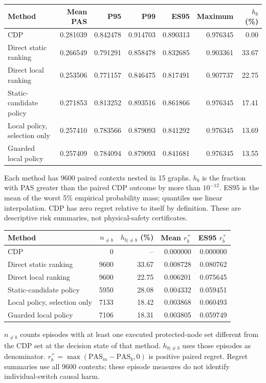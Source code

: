 \documentclass[10pt]{article}
\makeatletter
\newcommand{\tablefoot}[1]{\par\vspace{3pt}\begin{minipage}{\linewidth}\footnotesize #1\end{minipage}}
\newenvironment{exporttable}{\par\noindent\begin{minipage}{\linewidth}\def\@captype{table}}{\end{minipage}\par}
\makeatother
\begin{document}
\begin{exporttable}\centering
\small
\caption{Empirical service-loss and baseline-relative risk in the matched multi-topology study.}\label{tab:reliability_summary}
\begin{tabularx}{\linewidth}{Xrrrrrr}\toprule
Method & Mean PAS & P95 & P99 & ES95 & Maximum & $h_b$ (\%)\\\midrule
CDP & 0.281039 & 0.842478 & 0.914703 & 0.890313 & 0.976345 & 0.00\\
Direct static ranking & 0.266549 & 0.791291 & 0.858478 & 0.832685 & 0.903361 & 33.67\\
Direct local ranking & 0.253506 & 0.771157 & 0.846475 & 0.817491 & 0.907737 & 22.75\\
Static-candidate policy & 0.271853 & 0.813252 & 0.893516 & 0.861866 & 0.976345 & 17.41\\
Local policy, selection only & 0.257410 & 0.783566 & 0.879093 & 0.841292 & 0.976345 & 13.69\\
Guarded local policy & 0.257409 & 0.784094 & 0.879093 & 0.841681 & 0.976345 & 13.55\\
\bottomrule\end{tabularx}\tablefoot{Each method has 9600 paired contexts nested in 15 graphs. $h_b$ is the fraction with PAS greater than the paired CDP outcome by more than $10^{-12}$. ES95 is the mean of the worst 5\% empirical probability mass; quantiles use linear interpolation. CDP has zero regret relative to itself by definition. These are descriptive risk summaries, not physical-safety certificates.}
\end{exporttable}
\clearpage
\setcounter{table}{10}
\begin{exporttable}\centering
\small
\caption{Allocation-conditioned deterioration rate and overall baseline-relative regret.}\label{tab:reliability_conditional}
\begin{tabularx}{\linewidth}{Xrrrr}\toprule
Method & $n_{\ne b}$ & $h_{b\mid\ne b}$ (\%) & Mean $r_b^+$ & ES95 $r_b^+$\\\midrule
CDP & 0 & -- & 0.000000 & 0.000000\\
Direct static ranking & 9600 & 33.67 & 0.008728 & 0.080762\\
Direct local ranking & 9600 & 22.75 & 0.006201 & 0.075645\\
Static-candidate policy & 5950 & 28.08 & 0.004332 & 0.059451\\
Local policy, selection only & 7133 & 18.42 & 0.003868 & 0.060493\\
Guarded local policy & 7106 & 18.31 & 0.003805 & 0.059749\\
\bottomrule\end{tabularx}\tablefoot{$n_{\ne b}$ counts episodes with at least one executed protected-node set different from the CDP set at the decision state of that method. $h_{b\mid\ne b}$ uses those episodes as denominator. $r_b^+=\max(\mathrm{PAS}_m-\mathrm{PAS}_b,0)$ is positive paired regret. Regret summaries use all 9600 contexts; these episode measures do not identify individual-switch causal harm.}
\end{exporttable}
\end{document}
